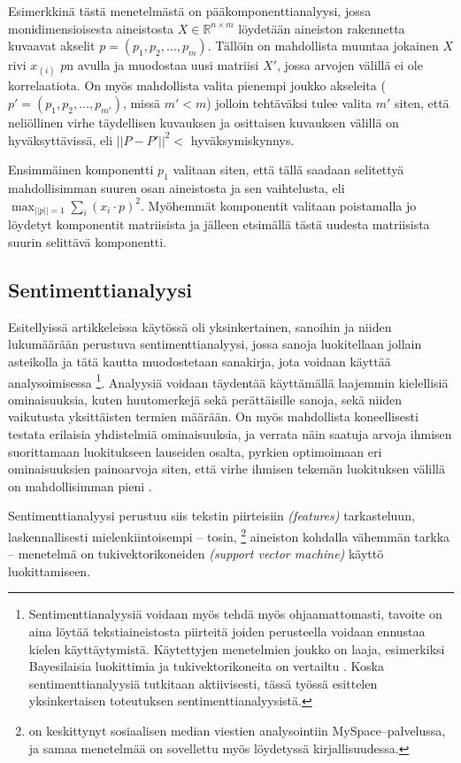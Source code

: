 \documentclass[finnish,gradu,twoside,12pt]{tktltiki}
\begin{document}
{Esimerkkinä tästä menetelmästä on pääkomponenttianalyysi, jossa monidimensioisesta aineistosta $X \in \mathbb{R}^{ n \times m}$ löydetään aineiston rakennetta kuvaavat akselit $p = ( p_1, p_2, \ldots, p_m )$. Tällöin on mahdollista muuntaa jokainen $X$ rivi $x_(i)$ $p$n avulla ja muodostaa uusi matriisi $X'$, jossa arvojen välillä ei ole korrelaatiota. On myös mahdollista valita pienempi joukko akseleita ($p' = (p_1, p_2, \ldots, p_{m'})$, missä $m' < m$) jolloin tehtäväksi tulee valita $m'$ siten, että neliöllinen virhe täydellisen kuvauksen ja osittaisen kuvauksen välillä on hyväksyttävissä, eli $||P-P'||^2 < $ hyväksymiskynnys.

Ensimmäinen komponentti $p_1$ valitaan siten, että tällä saadaan selitettyä mahdollisimman suuren osan aineistosta ja sen vaihtelusta, eli $\max_{||p||=1} \sum_i (x_i \cdot p )^2$. Myöhemmät komponentit valitaan poistamalla jo löydetyt komponentit matriisista ja jälleen etsimällä tästä uudesta matriisista suurin selittävä  komponentti.

\subsection{Sentimenttianalyysi}

Esitellyissä artikkeleissa käytössä oli yksinkertainen, sanoihin ja niiden lukumäärään perustuva sentimenttianalyysi, jossa sanoja luokitellaan jollain asteikolla ja tätä kautta muodostetaan sanakirja, jota voidaan käyttää analysoimisessa \citep{pennebaker2001linguistic,Thelwall2010}\footnote{Sentimenttianalyysiä voidaan myös tehdä myös ohjaamattomasti, tavoite on aina löytää tekstiaineistosta piirteitä joiden perusteella voidaan ennustaa kielen käyttäytymistä. Käytettyjen menetelmien joukko on laaja, esimerkiksi Bayesilaisia luokittimia ja tukivektorikoneita on vertailtu \citep{Pang02a,Pang05a,Thelwall2010}. Koska sentimenttianalyysiä tutkitaan aktiivisesti, tässä työssä esittelen yksinkertaisen toteutuksen sentimenttianalyysistä.}. Analyysiä voidaan täydentää käyttämällä laajemmin kielellisiä ominaisuuksia, kuten huutomerkejä sekä perättäisille sanoja, sekä niiden vaikutusta yksittäisten termien määrään. On myös mahdollista koneellisesti testata erilaisia yhdistelmiä ominaisuuksia, ja verrata näin saatuja arvoja ihmisen suorittamaan luokitukseen lauseiden osalta, pyrkien optimoimaan eri ominaisuuksien painoarvoja siten, että virhe ihmisen tekemän luokituksen välillä on mahdollisimman pieni \citep{Thelwall2010}.

Sentimenttianalyysi perustuu siis tekstin piirteisiin \textit{(features)} tarkasteluun, laskennallisesti mielenkiintoisempi -- tosin, \citet{Thelwall2010}\footnote{\citet{Thelwall2010} on keskittynyt sosiaalisen median viestien analysointiin MySpace--palvelussa, ja samaa menetelmää on sovellettu myös löydetyssä kirjallisuudessa.} aineiston kohdalla vähemmän tarkka -- menetelmä on tukivektorikoneiden \textit{(support vector machine)} käyttö luokittamiseen.

}
\end{document}
